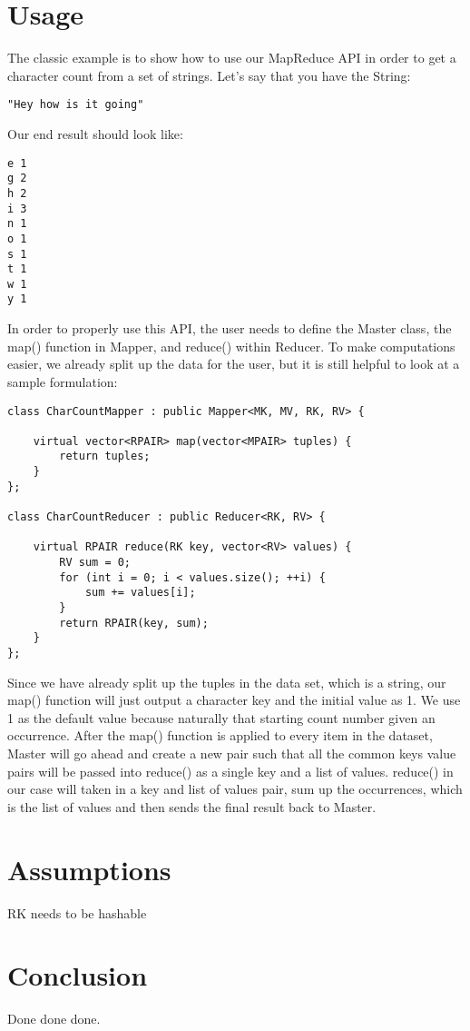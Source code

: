 \documentclass[11pt]{article}
\begin{document}
\section{Usage}
The classic example is to show how to use our MapReduce API in order to get a character count from a set of strings. Let's say that you have the String:
\begin{verbatim}
"Hey how is it going"
\end{verbatim}
Our end result should look like:
\begin{verbatim}
e 1
g 2
h 2
i 3
n 1
o 1
s 1
t 1
w 1
y 1
\end{verbatim}
In order to properly use this API, the user needs to define the Master class, the map() function in Mapper, and reduce() within Reducer. To make computations easier, we already split up the data for the user, but it is still helpful to look at a sample formulation:
\begin{verbatim}
class CharCountMapper : public Mapper<MK, MV, RK, RV> {

    virtual vector<RPAIR> map(vector<MPAIR> tuples) {
        return tuples;
    }
};

class CharCountReducer : public Reducer<RK, RV> {

    virtual RPAIR reduce(RK key, vector<RV> values) {
        RV sum = 0;
        for (int i = 0; i < values.size(); ++i) {
            sum += values[i];
        }
        return RPAIR(key, sum);
    }
};
\end{verbatim}
Since we have already split up the tuples in the data set, which is a string, our map() function will just output a character key and the initial value as 1. We use 1 as the default value because naturally that starting count number given an occurrence. After the map() function is applied to every item in the dataset, Master will go ahead and create a new pair such that all the common keys value pairs will be passed into reduce() as a single key and a list of values. reduce() in our case will taken in a key and list of values pair, sum up the occurrences, which is the list of values and then sends the final result back to Master.
\section{Assumptions}
RK needs to be hashable

\section{Conclusion}
Done done done.
\end{document}
